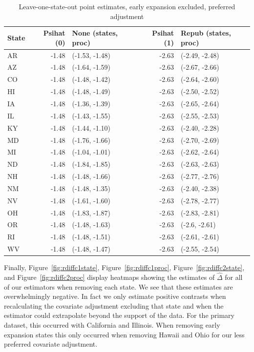 \documentclass[12pt]{article}
\begin{document}
\begin{table}[ht]
\centering
\begin{tabular}{lrlrl}
  \toprule
State & Psihat (0) & None (states, proc) & Psihat (1) & Repub (states, proc) \\ 
  \midrule
AR & -1.48 & (-1.53, -1.48) & -2.63 & (-2.49, -2.48) \\ 
  AZ & -1.48 & (-1.64, -1.59) & -2.63 & (-2.67, -2.66) \\ 
  CO & -1.48 & (-1.48, -1.42) & -2.63 & (-2.64, -2.60) \\ 
  HI & -1.48 & (-1.48, -1.49) & -2.63 & (-2.50, -2.52) \\ 
  IA & -1.48 & (-1.36, -1.39) & -2.63 & (-2.65, -2.64) \\ 
  IL & -1.48 & (-1.43, -1.55) & -2.63 & (-2.55, -2.53) \\ 
  KY & -1.48 & (-1.44, -1.10) & -2.63 & (-2.40, -2.28) \\ 
  MD & -1.48 & (-1.76, -1.66) & -2.63 & (-2.70, -2.69) \\ 
  MI & -1.48 & (-1.04, -1.01) & -2.63 & (-2.62, -2.64) \\ 
  ND & -1.48 & (-1.84, -1.85) & -2.63 & (-2.63, -2.63) \\ 
  NH & -1.48 & (-1.48, -1.66) & -2.63 & (-2.77, -2.76) \\ 
  NM & -1.48 & (-1.48, -1.35) & -2.63 & (-2.40, -2.38) \\ 
  NV & -1.48 & (-1.61, -1.60) & -2.63 & (-2.78, -2.77) \\ 
  OH & -1.48 & (-1.83, -1.87) & -2.63 & (-2.83, -2.81) \\ 
  OR & -1.48 & (-1.48, -1.63) & -2.63 & (-2.6, -2.61) \\ 
  RI & -1.48 & (-1.48, -1.51) & -2.63 & (-2.61, -2.61) \\ 
  WV & -1.48 & (-1.48, -1.47) & -2.63 & (-2.55, -2.54) \\ 
   \bottomrule
\end{tabular}
   \caption{Leave-one-state-out point estimates, early expansion excluded, preferred adjustment}
    \label{tab:loostatec2}
\end{table}

Finally, Figure~\ref{fig:rdiffc1state}, Figure~\ref{fig:rdiffc1proc}, Figure~\ref{fig:rdiffc2state}, and Figure~\ref{fig:rdiffc2proc} display heatmaps showing the estimates of $\hat{\Delta}$ for all of our estimators when removing each state. We see that these estimates are overwhelmingly negative. In fact we only estimate positive contrasts when recalculating the covariate adjustment excluding that state and when the estimator could extrapolate beyond the support of the data. For the primary dataset, this occurred with California and Illinois. When removing early expansion states this only occurred when removing Hawaii and Ohio for our less preferred covariate adjustment.
\end{document}
